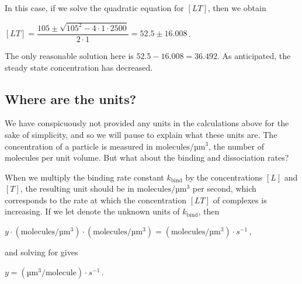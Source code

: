 \noindent In this case, if we solve the quadratic equation for $[LT]$, then we obtain

\begin{center}
$[LT] = \dfrac{105 \pm \sqrt{105^2 - 4 \cdot 1 \cdot 2500}}{2 \cdot 1} = 52.5 \pm 16.008$\,.
\end{center}

\noindent The only reasonable solution here is $52.5-16.008 = 36.492$. As anticipated, the steady state concentration has decreased.\\

\begin{qbox}\end{qbox}

\FloatBarrier
{}
\subsection{Where are the units?}

We have conspicuously not provided any units in the calculations above for the sake of simplicity, and so we will pause to explain what these units are. The concentration of a particle is measured in $\text{molecules}/\text{µm}^3$, the number of molecules per unit volume. But what about the binding and dissociation rates?

When we multiply the binding rate constant $k_\text{bind}$ by the concentrations $[L]$ and $[T]$, the resulting unit should be in $\text{molecules}/\text{µm}^3$ per second, which corresponds to the rate at which the concentration $[LT]$ of complexes is increasing. If we let  denote the unknown units of $k_\text{bind}$, then

\begin{center}
$y \cdot (\text{molecules}/\text{µm}^3) \cdot (\text{molecules}/\text{µm}^3) = (\text{molecules}/\text{µm}^3) \cdot s^{-1}$\,,
\end{center}

\noindent and solving for  gives

\begin{center}
$y = (\text{µm}^3/\text{molecule}) \cdot s^{-1}$\,.
\end{center}

